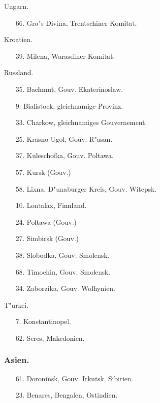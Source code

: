 \documentclass[a4paper, 11pt, oneside, polutonikogreek, german]{article}
\begin{document}
\begin{center}
Ungarn.
\end{center}
\begin{itemize}
    \small
    \item[66.] Gro"s-Divina, Trentschiner-Komitat.
\end{itemize}
\begin{center}
Kroatien.
\end{center}
\begin{itemize}
    \small
    \item[39.] Milena, Warasdiner-Komitat.
\end{itemize}
\begin{center}
Russland.
\end{center}
\begin{itemize}
    \small
    \item[35.] Bachmut, Gouv. Ekaterinoslaw.
    \item[9.] Bialistock, gleichnamige Provinz.
    \item[33.] Charkow, gleichnamiges Gouvernement.
    \item[25.] Krasno-Ugol, Gouv. R"asan.
    \item[37.] Kuleschofka, Gouv. Poltawa.
    \item[57.] Kursk (Gouv.)
    \item[58.] Lixna, D"unaburger Kreis, Gouv. Witepsk.
    \item[10.] Lontalax, Finnland.
    \item[24.] Poltawa (Gouv.)
    \item[27.] Simbirsk (Gouv.)
    \item[38.] Slobodka, Gouv. Smolensk.
    \item[68.] Timochin, Gouv. Smolensk.
    \item[34.] Zaborzika, Gouv. Wolhynien.
\end{itemize}
\begin{center}
T"urkei.
\end{center}
\begin{itemize}
    \small
    \item[7.] Konstantinopel.
    \item[62.] Seres, Makedonien.
\end{itemize}
\subsubsection{Asien.}
\begin{itemize}
    \small
    \item[61.] Doroninsk, Gouv. Irkutsk, Sibirien.
    \item[23.] Benares, Bengalen, Ostindien.
\end{itemize}
\end{document}
